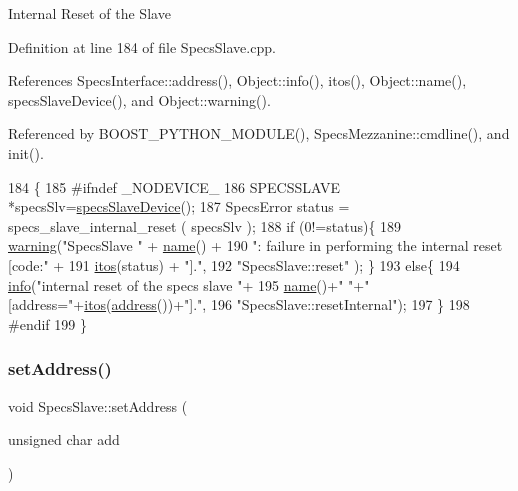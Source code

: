 Internal Reset of the Slave 

Definition at line 184 of file Specs\+Slave.\+cpp.



References Specs\+Interface\+::address(), Object\+::info(), itos(), Object\+::name(), specs\+Slave\+Device(), and Object\+::warning().



Referenced by B\+O\+O\+S\+T\+\_\+\+P\+Y\+T\+H\+O\+N\+\_\+\+M\+O\+D\+U\+L\+E(), Specs\+Mezzanine\+::cmdline(), and init().


\begin{DoxyCode}
184                               \{
185 \textcolor{preprocessor}{#ifndef \_NODEVICE\_
}
186   SPECSSLAVE *specsSlv=\hyperlink{classSpecsSlave_a44970aca61b6fdcd6d6d90e6601093f3}{specsSlaveDevice}();
187   SpecsError status = specs\_slave\_internal\_reset ( specsSlv );
188   \textcolor{keywordflow}{if} (0!=status)\{
189     \hyperlink{classObject_a65cd4fda577711660821fd2cd5a3b4c9}{warning}(\textcolor{stringliteral}{"SpecsSlave "} + \hyperlink{classObject_a300f4c05dd468c7bb8b3c968868443c1}{name}() +
190             \textcolor{stringliteral}{": failure in performing the internal reset [code:"} +
191             \hyperlink{Tools_8h_af330027dbdafb9a30768b3613c553e60}{itos}(status) + \textcolor{stringliteral}{"]."},
192             \textcolor{stringliteral}{"SpecsSlave::reset"} );   \}
193   \textcolor{keywordflow}{else}\{
194     \hyperlink{classObject_a644fd329ea4cb85f54fa6846484b84a8}{info}(\textcolor{stringliteral}{"internal reset of the specs slave "}+
195          \hyperlink{classObject_a300f4c05dd468c7bb8b3c968868443c1}{name}()+\textcolor{stringliteral}{" "}+\textcolor{stringliteral}{" [address="}+\hyperlink{Tools_8h_af330027dbdafb9a30768b3613c553e60}{itos}(\hyperlink{classSpecsInterface_a0fa039a15b842a5ba783ce825b9915d8}{address}())+\textcolor{stringliteral}{"]."},
196          \textcolor{stringliteral}{"SpecsSlave::resetInternal"});
197   \}
198 \textcolor{preprocessor}{#endif
}
199 \}
\end{DoxyCode}
\mbox{\label{classSpecsSlave_a1e5917c1f323cd7b4aabe4940c6baf12}} 
\subsubsection{\texorpdfstring{set\+Address()}{setAddress()}}
{\footnotesize\ttfamily void Specs\+Slave\+::set\+Address (\begin{DoxyParamCaption}\item[{unsigned char}]{add }\end{DoxyParamCaption})}




